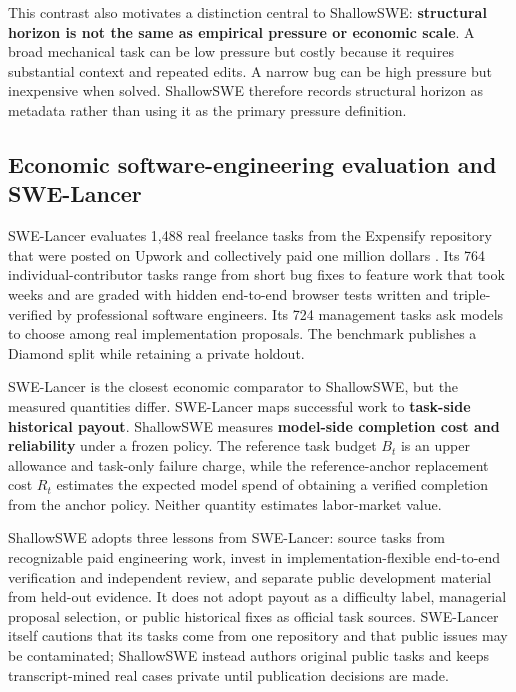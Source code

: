 \documentclass[11pt]{article}
\begin{document}
This contrast also motivates a distinction central to ShallowSWE: \textbf{structural horizon is not the same as empirical pressure or economic scale}. A broad mechanical task can be low pressure but costly because it requires substantial context and repeated edits. A narrow bug can be high pressure but inexpensive when solved. ShallowSWE therefore records structural horizon as metadata rather than using it as the primary pressure definition.

\subsection{Economic software-engineering evaluation and SWE-Lancer}\hypertarget{33-economic-software-engineering-evaluation-and-swe-lancer}{}\label{33-economic-software-engineering-evaluation-and-swe-lancer}

SWE-Lancer evaluates 1,488 real freelance tasks from the Expensify repository that were posted on Upwork and collectively paid one million dollars \citep{miserendino2025swelancer}. Its 764 individual-contributor tasks range from short bug fixes to feature work that took weeks and are graded with hidden end-to-end browser tests written and triple-verified by professional software engineers. Its 724 management tasks ask models to choose among real implementation proposals. The benchmark publishes a Diamond split while retaining a private holdout.

SWE-Lancer is the closest economic comparator to ShallowSWE, but the measured quantities differ. SWE-Lancer maps successful work to \textbf{task-side historical payout}. ShallowSWE measures \textbf{model-side completion cost and reliability} under a frozen policy. The reference task budget $B_t$ is an upper allowance and task-only failure charge, while the reference-anchor replacement cost $R_t$ estimates the expected model spend of obtaining a verified completion from the anchor policy. Neither quantity estimates labor-market value.

ShallowSWE adopts three lessons from SWE-Lancer: source tasks from recognizable paid engineering work, invest in implementation-flexible end-to-end verification and independent review, and separate public development material from held-out evidence. It does not adopt payout as a difficulty label, managerial proposal selection, or public historical fixes as official task sources. SWE-Lancer itself cautions that its tasks come from one repository and that public issues may be contaminated; ShallowSWE instead authors original public tasks and keeps transcript-mined real cases private until publication decisions are made.
\end{document}
